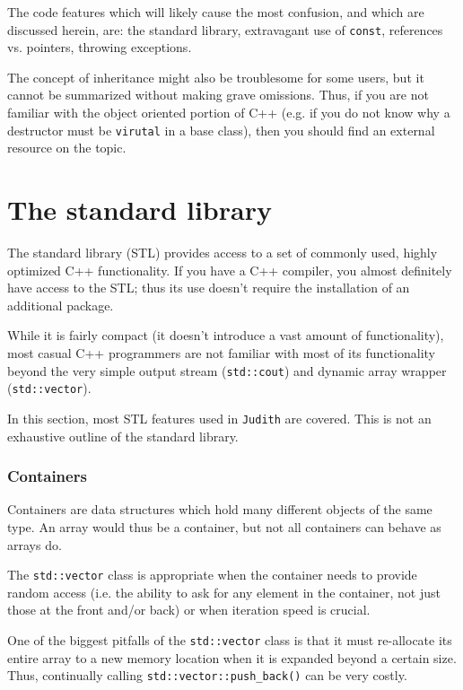 \documentclass[10pt,a4paper]{book}
\newcommand{\Judith}{\Verb`Judith` }
\begin{document}
The code features which will likely cause the most confusion, and which are discussed herein, are: the standard library, extravagant use of \Verb`const`, references vs. pointers, throwing exceptions.

The concept of inheritance might also be troublesome for some users, but it cannot be summarized without making grave omissions. Thus, if you are not familiar with the object oriented portion of C++ (e.g. if you do not know why a destructor must be \Verb`virutal` in a base class), then you should find an external resource on the topic.

\section{The standard library}

The standard library (STL) provides access to a set of commonly used, highly optimized C++ functionality. If you have a C++ compiler, you almost definitely have access to the STL; thus its use doesn't require the installation of an additional package.

While it is fairly compact (it doesn't introduce a vast amount of functionality), most casual C++ programmers are not familiar with most of its functionality beyond the very simple output stream (\Verb`std::cout`) and dynamic array wrapper (\Verb`std::vector`).

In this section, most STL features used in \Judith are covered. This is not an exhaustive outline of the standard library.

\subsubsection{Containers}

Containers are data structures which hold many different objects of the same type. An array would thus be a container, but not all containers can behave as arrays do.

The \Verb`std::vector` class is appropriate when the container needs to provide random access (i.e. the ability to ask for any element in the container, not just those at the front and/or back) or when iteration speed is crucial.

One of the biggest pitfalls of the \Verb`std::vector` class is that it must re-allocate its entire array to a new memory location when it is expanded beyond a certain size. Thus, continually calling \Verb`std::vector::push_back()` can be very costly.
\end{document}
